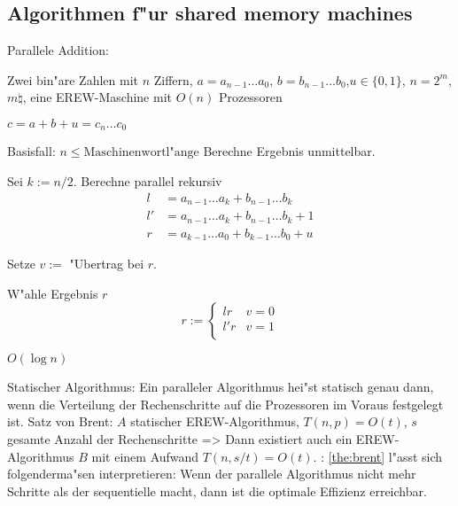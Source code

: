 \subsection{Algorithmen f"ur shared memory machines}
\algorithm Parallele Addition:{
  \given Zwei bin"are Zahlen mit $n$ Ziffern, $a=a_{n-1}\ldots a_0$,
     $b=b_{n-1}\ldots b_0$,$u\in\{0,1\}$, $n=2^m$, $m\natural$,
     eine EREW-Maschine mit $O(n)$ Prozessoren
  
  \aim $c=a+b+u=c_n\ldots c_0$
  
  \begin{proc}
    \item Basisfall: $n\le\text{Maschinenwortl"ange}$ Berechne Ergebnis 
      unmittelbar.
    \item Sei $k:=n/2$. Berechne parallel rekursiv
      \begin{align*}
        l&=a_{n-1}\ldots a_k+b_{n-1}\ldots b_k \\
        l'&=a_{n-1}\ldots a_k+b_{n-1}\ldots b_k+1 \\
        r&=a_{k-1}\ldots a_0+b_{k-1}\ldots b_0+u 
      \end{align*}
    \item Setze $v:=$ "Ubertrag bei $r$.
    \item W"ahle Ergebnis $r$
      \[
        r:=\begin{cases}
          lr & v=0 \\
          l'r & v=1 \\
        \end{cases}
     \]
  \end{proc}
  
  \cpx $O(\log n)$ 
}
 Statischer Algorithmus:{
  Ein paralleler Algorithmus hei"st statisch genau dann, wenn die
  Verteilung der Rechenschritte auf die Prozessoren im Voraus 
  festgelegt ist.
}
\theorem Satz von Brent:
  $A$ statischer EREW-Algorithmus, $T(n,p)=O(t)$, $s$ gesamte Anzahl der 
  Rechenschritte
  =>
{
  \label{the:brent}
  Dann existiert auch ein EREW-Algorithmus $B$ mit einem Aufwand $T(n,s/t)=O(t)$.
}
\remark:{
  \ref{the:brent} l"asst sich folgenderma"sen interpretieren:
  Wenn der parallele Algorithmus nicht mehr Schritte als der sequentielle macht,
  dann ist die optimale Effizienz erreichbar.
}
